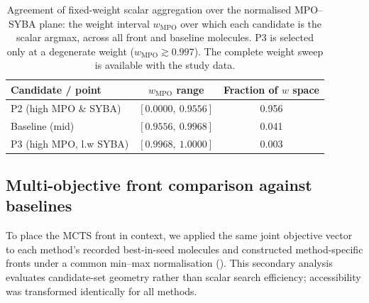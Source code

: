 \documentclass[10pt,a4paper]{article}
\begin{document}
\begin{table}[htbp]
  \centering
  \caption{Agreement of fixed-weight scalar aggregation over the normalised MPO--SYBA plane: the weight interval $w_{\text{MPO}}$ over which each candidate is the scalar argmax, across all front and baseline molecules. P3 is selected only at a degenerate weight ($w_{\text{MPO}}\gtrsim\num{0.997}$). The complete weight sweep is available with the study data.}
  \label{tab:scalar_sweep}
  \begin{tabular}{lcS[table-format=1.3]}
    \toprule
    {Candidate / point} & {$w_{\text{MPO}}$ range} & {Fraction of $w$ space} \\
    \midrule
    P2 (high MPO \& SYBA) & $[0.0000,\ 0.9556]$ & \num{0.956} \\
    Baseline (mid)         & $[0.9556,\ 0.9968]$ & \num{0.041} \\
    P3 (high MPO, l.w SYBA) & $[0.9968,\ 1.0000]$ & \num{0.003} \\
    \bottomrule
  \end{tabular}
\end{table}

\subsection{Multi-objective front comparison against baselines}
\label{sec:front_comparison}

To place the MCTS front in context, we applied the same joint objective vector to each method's recorded best-in-seed molecules and constructed method-specific fronts under a common min--max normalisation (). This secondary analysis evaluates candidate-set geometry rather than scalar search efficiency; accessibility was transformed identically for all methods.
\end{document}
